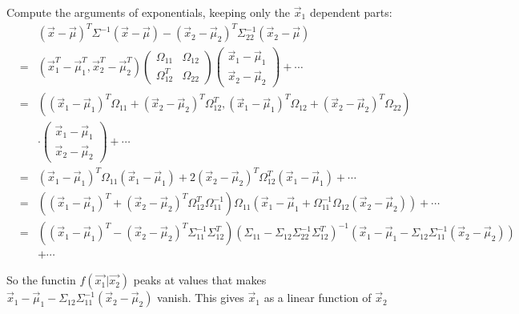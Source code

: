 \documentclass{article}
\begin{document}
\begin{enumerate}[(A)]
Compute the arguments of exponentials, keeping only the $\vec{x}_1$ dependent parts:
\begin{eqnarray}
&&(\vec{x}-\vec{\mu})^T\Sigma^{-1}(\vec{x}-\vec{\mu})-(\vec{x}_2-\vec{\mu}_2)^T\Sigma_{22}^{-1}(\vec{x}_2-\vec{\mu})\nonumber\\
&=&(\vec{x}_1^T-\vec{\mu}_1^T,\vec{x}_2^T-\vec{\mu}_2^T)\left( \begin{array}{cc}
\Omega_{11} & \Omega_{12}   \\
\Omega_{12}^T & \Omega_{22}   \end{array} \right)
\left(\begin{array}{c}
\vec{x}_1-\vec{\mu}_1 \\
\vec{x}_2-\vec{\mu}_2 \end{array} \right)+\cdots\nonumber\\
&=&((\vec{x}_1-\vec{\mu}_1)^T\Omega_{11}+(\vec{x}_2-\vec{\mu}_2)^T\Omega_{12}^T,(\vec{x}_1-\vec{\mu}_1)^T\Omega_{12}+(\vec{x}_2-\vec{\mu}_2)^T\Omega_{22})\nonumber\\
&&\cdot\left(\begin{array}{c}
\vec{x}_1-\vec{\mu}_1 \\
\vec{x}_2-\vec{\mu}_2 \end{array} \right)+\cdots\nonumber\\
&=&(\vec{x}_1-\vec{\mu}_1)^T\Omega_{11}(\vec{x}_1-\vec{\mu}_1)+2(\vec{x}_2-\vec{\mu}_2)^T\Omega_{12}^T(\vec{x}_1-\vec{\mu}_1)+\cdots\nonumber\\
&=&((\vec{x}_1-\vec{\mu}_1)^T+(\vec{x}_2-\vec{\mu}_2)^T\Omega_{12}^T\Omega_{11}^{-1})\Omega_{11}(\vec{x}_1-\vec{\mu}_1+\Omega_{11}^{-1}\Omega_{12}(\vec{x}_2-\vec{\mu}_2))+\cdots\nonumber\\
&=&((\vec{x}_1-\vec{\mu}_1)^T-(\vec{x}_2-\vec{\mu}_2)^T\Sigma_{11}^{-1}\Sigma_{12}^T)(\Sigma_{11}-\Sigma_{12}\Sigma_{22}^{-1}\Sigma_{12}^T)^{-1}(\vec{x}_1-\vec{\mu}_1-\Sigma_{12}\Sigma_{11}^{-1}(\vec{x}_2-\vec{\mu}_2))\nonumber\\
&&+\cdots
\end{eqnarray}

So the functin $f(\vec{x_1}|\vec{x_2})$ peaks at values that makes $\vec{x}_1-\vec{\mu}_1-\Sigma_{12}\Sigma_{11}^{-1}(\vec{x}_2-\vec{\mu}_2)$ vanish. This gives $\vec{x}_1$ as a linear function of $\vec{x}_2$
\end{enumerate}
\end{document}
